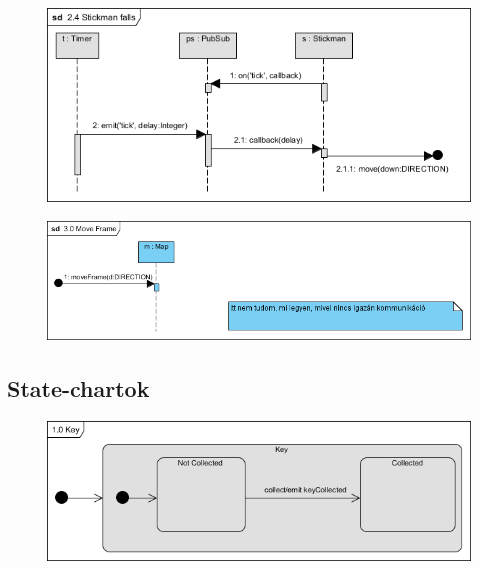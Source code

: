 		\begin{figure}[h!]
			\begin{center}
				\includegraphics[scale=0.8]{resources/seq_2-4_stickmanFalls.png}
				\caption{}
			\end{center}
		\end{figure}
		
			\begin{figure}[h!]
			\begin{center}
				\includegraphics[scale=0.8]{resources/seq_3-0_moveFrame.png}
				\caption{}
			\end{center}
		\end{figure}
		
		
	
	\subsection{State-chartok}
	
	\begin{figure}[h!]
			\begin{center}
				\includegraphics[scale=0.8]{resources/state_1-0_key.png}
				\caption{}
			\end{center}
		\end{figure}
		
